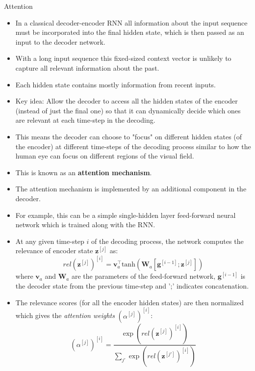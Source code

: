 \documentclass[11pt,compress,t,notes=noshow, xcolor=table]{beamer}
\begin{document}
\begin{vbframe}{Attention}
  \begin{itemize}
    \item In a classical decoder-encoder RNN all information about the input sequence must be incorporated into the final hidden state, which is then passed as an input to the decoder network.
    \item With a long input sequence this fixed-sized context vector is unlikely to capture all relevant information about the past.
      \item Each hidden state contains mostly information from recent inputs. 
      \item Key idea: Allow the decoder to access all the hidden states of the encoder (instead of just the final one) so that it can dynamically decide which ones are relevant at each time-step in the decoding.
      \item This means the decoder can choose to "focus" on different hidden states (of the encoder) at different time-steps of the decoding process similar to how the human eye can focus on different regions of the visual field.
      \item This is known as an \textbf{attention mechanism}.
   \end{itemize}
   
   \framebreak
   
   \begin{itemize}
      \item The attention mechanism is implemented by an additional component in the decoder.
      \item For example, this can be a simple single-hidden layer feed-forward neural network which is trained along with the RNN.
      \item At any given time-step $i$ of the decoding process, the network computes the relevance of encoder state $\mathbf{z}^{[j]}$ as:
            $$ rel(\mathbf{z}^{[j]})^{[i]} = \mathbf{v}_a^\top \text{tanh} (\mathbf{W}_a[\mathbf{g}^{[i-1]};\mathbf{z}^{[j]}]) $$
            where $\mathbf{v}_a$ and $\mathbf{W}_a$ are the parameters of the feed-forward network, $\mathbf{g}^{[i-1]}$ is the decoder state from the previous time-step and ';' indicates concatenation.
      \item The relevance scores (for all the encoder hidden states) are then normalized which gives the \textit{attention weights} $(\alpha^{[j]})^{[i]}$:      
        $$ (\alpha^{[j]})^{[i]} = \frac{\exp (rel(\mathbf{z}^{[j]})^{[i]})}{\sum_{j'} \exp(rel(\mathbf{z}^{[j']})^{[i]})} $$
   \end{itemize}
   

\end{vbframe}
\end{document}
